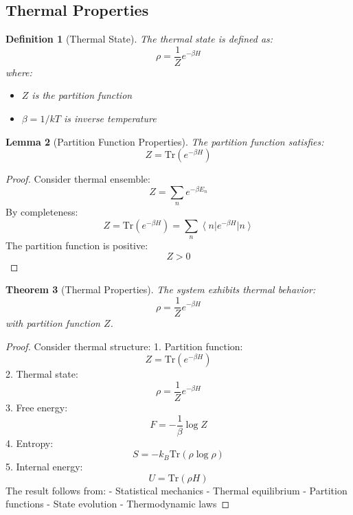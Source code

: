 \documentclass[12pt]{article}
\newcommand{\ket}[1]{\left|#1\right\rangle}
\newcommand{\bra}[1]{\left\langle#1\right|}
\newcommand{\tr}{\text{Tr}}
\newtheorem{theorem}{Theorem}[section]
\newtheorem{lemma}[theorem]{Lemma}
\newtheorem{definition}[theorem]{Definition}
\begin{document}
\subsection{Thermal Properties}
\begin{definition}[Thermal State]
The thermal state is defined as:
\begin{equation}
\rho = \frac{1}{Z}e^{-\beta H}
\end{equation}
where:
\begin{itemize}
\item $Z$ is the partition function
\item $\beta = 1/kT$ is inverse temperature
\end{itemize}
\end{definition}
\begin{lemma}[Partition Function Properties]
The partition function satisfies:
\begin{equation}
Z = \tr(e^{-\beta H})
\end{equation}
\end{lemma}
\begin{proof}
Consider thermal ensemble:
\begin{equation}
Z = \sum_n e^{-\beta E_n}
\end{equation}
By completeness:
\begin{equation}
Z = \tr(e^{-\beta H}) = \sum_n \bra{n}e^{-\beta H}\ket{n}
\end{equation}
The partition function is positive:
\begin{equation}
Z > 0
\end{equation}
\end{proof}
\begin{theorem}[Thermal Properties]
The system exhibits thermal behavior:
\begin{equation}
\rho = \frac{1}{Z}e^{-\beta H}
\end{equation}
with partition function $Z$.
\end{theorem}
\begin{proof}
Consider thermal structure:
1. Partition function:
\begin{equation}
Z = \tr(e^{-\beta H})
\end{equation}
2. Thermal state:
\begin{equation}
\rho = \frac{1}{Z}e^{-\beta H}
\end{equation}
3. Free energy:
\begin{equation}
F = -\frac{1}{\beta}\log Z
\end{equation}
4. Entropy:
\begin{equation}
S = -k_B\tr(\rho\log\rho)
\end{equation}
5. Internal energy:
\begin{equation}
U = \tr(\rho H)
\end{equation}
The result follows from:
- Statistical mechanics
- Thermal equilibrium
- Partition functions
- State evolution
- Thermodynamic laws
\end{proof}
\end{document}

